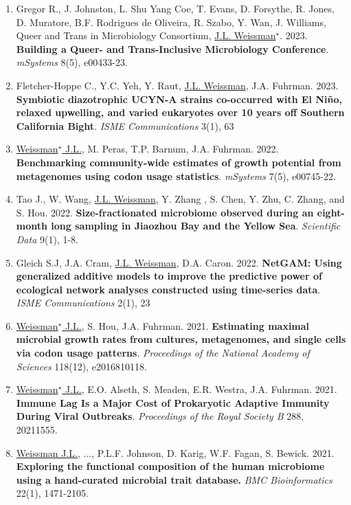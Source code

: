 \documentclass[]{res}
\begin{document}
\begin{resume}
\begin{enumerate}[leftmargin=*]
 \item Gregor R., J. Johnston, L. Shu Yang Coe, T. Evans, D. Forsythe, R. Jones, D. Muratore, B.F. Rodrigues de Oliveira, R. Szabo, Y. Wan, J. Williams, Queer and Trans in Microbiology Consortium, \underline{J.L. Weissman$^\star$}. 2023. {\bf Building a Queer- and Trans-Inclusive Microbiology Conference}. \emph{mSystems} 8(5), e00433-23.
 
\item Fletcher-Hoppe C., Y.C. Yeh, Y. Raut, \underline{J.L. Weissman}, J.A. Fuhrman. 2023. {\bf Symbiotic diazotrophic UCYN-A strains co-occurred with El Niño, relaxed upwelling, and varied eukaryotes over 10 years off Southern California Bight}. \emph{ISME Communications} 3(1), 63
 
\newpage 
 
  \item \underline{Weissman$^\star$ J.L.}, M. Peras, T.P. Barnum, J.A. Fuhrman. 2022. {\bf Benchmarking community-wide estimates of growth potential from metagenomes using codon usage statistics}. \emph{mSystems} 7(5), e00745-22.
  
    \item  Tao J., W. Wang, \underline{J.L. Weissman}, Y. Zhang , S. Chen, Y. Zhu, C. Zhang, and S. Hou. 2022. {\bf Size-fractionated microbiome observed during an eight-month long sampling in Jiaozhou Bay and the Yellow Sea}. \emph{Scientific Data} 9(1), 1-8.
 
 \item Gleich S.J, J.A. Cram, \underline{J.L. Weissman}, D.A. Caron. 2022. {\bf NetGAM: Using generalized additive models to improve the predictive power of ecological network analyses constructed using time-series data}. \emph{ISME Communications} 2(1), 23
 
\item \underline{Weissman$^\star$ J.L.}, S. Hou, J.A. Fuhrman. 2021. {\bf Estimating maximal microbial growth rates from cultures, metagenomes, and single cells via codon usage patterns}. \emph{Proceedings of the National Academy of Sciences} 118(12), e2016810118. 
 
\item \underline{Weissman$^\star$ J.L.}, E.O. Alseth, S. Meaden, E.R. Westra, J.A. Fuhrman. 2021. {\bf Immune Lag Is a Major Cost of Prokaryotic Adaptive Immunity During Viral Outbreaks}. \emph{Proceedings of the Royal Society B} 288, 20211555.

\item \underline{Weissman J.L.}, ..., P.L.F. Johnson, D. Karig, W.F. Fagan, S. Bewick. 2021. {\bf Exploring the functional composition of the human microbiome using a hand-curated microbial trait database.} \emph{BMC Bioinformatics} 22(1), 1471-2105.


\end{enumerate}
\end{resume}
\end{document}
